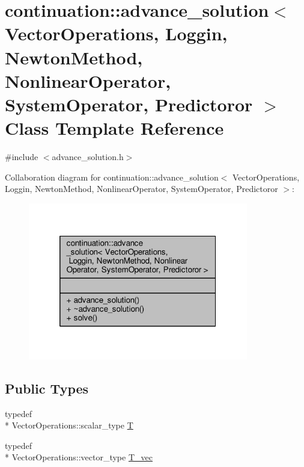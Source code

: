 \hypertarget{classcontinuation_1_1advance__solution}{\section{continuation\-:\-:advance\-\_\-solution$<$ Vector\-Operations, Loggin, Newton\-Method, Nonlinear\-Operator, System\-Operator, Predictoror $>$ Class Template Reference}
\label{classcontinuation_1_1advance__solution}
}


{\ttfamily \#include $<$advance\-\_\-solution.\-h$>$}



Collaboration diagram for continuation\-:\-:advance\-\_\-solution$<$ Vector\-Operations, Loggin, Newton\-Method, Nonlinear\-Operator, System\-Operator, Predictoror $>$\-:
\nopagebreak
\begin{figure}[H]
\begin{center}
\leavevmode
\includegraphics[width=272pt]{classcontinuation_1_1advance__solution__coll__graph}
\end{center}
\end{figure}
\subsection*{Public Types}
\begin{DoxyCompactItemize}
\item 
typedef \\*
Vector\-Operations\-::scalar\-\_\-type \hyperlink{classcontinuation_1_1advance__solution_a525792bcc16846c5ba10f15400d53fed}{T}
\item 
typedef \\*
Vector\-Operations\-::vector\-\_\-type \hyperlink{classcontinuation_1_1advance__solution_a2c54f76f6415c6d28af4c97f7d6fe605}{T\-\_\-vec}
\end{DoxyCompactItemize}
